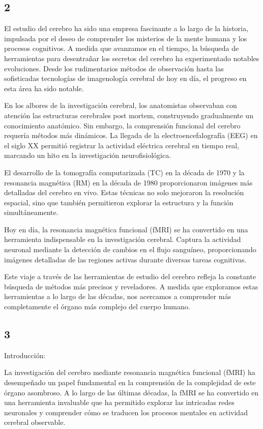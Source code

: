 \documentclass[12pt,oneside]{uhthesis}
\begin{document}
\subsection{2}

El estudio del cerebro ha sido una empresa fascinante a lo largo de la historia, impulsada por el deseo de comprender los misterios de la mente humana y los procesos cognitivos. A medida que avanzamos en el tiempo, la búsqueda de herramientas para desentrañar los secretos del cerebro ha experimentado notables evoluciones. Desde los rudimentarios métodos de observación hasta las sofisticadas tecnologías de imagenología cerebral de hoy en día, el progreso en esta área ha sido notable.

En los albores de la investigación cerebral, los anatomistas observaban con atención las estructuras cerebrales post mortem, construyendo gradualmente un conocimiento anatómico. Sin embargo, la comprensión funcional del cerebro requería métodos más dinámicos. La llegada de la electroencefalografía (EEG) en el siglo XX permitió registrar la actividad eléctrica cerebral en tiempo real, marcando un hito en la investigación neurofisiológica.

El desarrollo de la tomografía computarizada (TC) en la década de 1970 y la resonancia magnética (RM) en la década de 1980 proporcionaron imágenes más detalladas del cerebro en vivo. Estas técnicas no solo mejoraron la resolución espacial, sino que también permitieron explorar la estructura y la función simultáneamente.

Hoy en día, la resonancia magnética funcional (fMRI) se ha convertido en una herramienta indispensable en la investigación cerebral. Captura la actividad neuronal mediante la detección de cambios en el flujo sanguíneo, proporcionando imágenes detalladas de las regiones activas durante diversas tareas cognitivas.

Este viaje a través de las herramientas de estudio del cerebro refleja la constante búsqueda de métodos más precisos y reveladores. A medida que exploramos estas herramientas a lo largo de las décadas, nos acercamos a comprender más completamente el órgano más complejo del cuerpo humano.

\subsection{3}
Introducción:

La investigación del cerebro mediante resonancia magnética funcional (fMRI) ha desempeñado un papel fundamental en la comprensión de la complejidad de este órgano asombroso. A lo largo de las últimas décadas, la fMRI se ha convertido en una herramienta invaluable que ha permitido explorar las intricadas redes neuronales y comprender cómo se traducen los procesos mentales en actividad cerebral observable.
\end{document}
